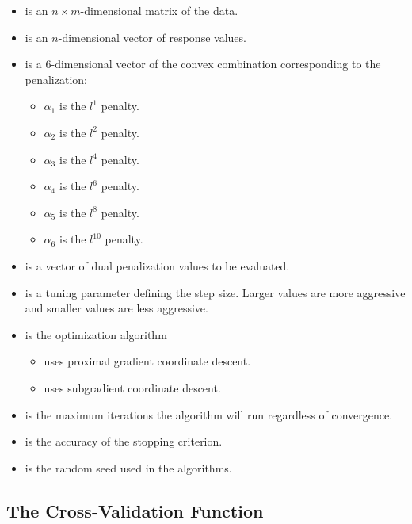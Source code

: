 \documentclass[article]{jss}
\numberwithin{equation}{section}
\begin{document}
\begin{itemize}
\item {} is an $n \times m$-dimensional matrix of the data.

\item {} is an $n$-dimensional vector of response values.

\item {} is a $6$-dimensional vector of the convex combination corresponding to the penalization:
 \begin{itemize}
   \item $\alpha_1$ is the $l^1$ penalty.
   \item $\alpha_2$ is the $l^2$ penalty.
   \item $\alpha_3$ is the $l^4$ penalty.
   \item $\alpha_4$ is the $l^6$ penalty.
   \item $\alpha_5$ is the $l^8$ penalty.
   \item $\alpha_6$ is the $l^{10}$ penalty.
\end{itemize}

\item {} is a vector of dual penalization values to be evaluated.

\item {} is a tuning parameter defining the step size. Larger values are more aggressive and smaller values are less aggressive.

\item {} is the optimization algorithm
\begin{itemize}
\item {} uses proximal gradient coordinate descent.
\item {} uses subgradient coordinate descent.
\end{itemize}

\item {} is the maximum iterations the algorithm will run regardless of convergence.

\item {} is the accuracy of the stopping criterion.

\item {} is the random seed used in the algorithms.

\end{itemize}

\subsection{The Cross-Validation Function}
\end{document}
